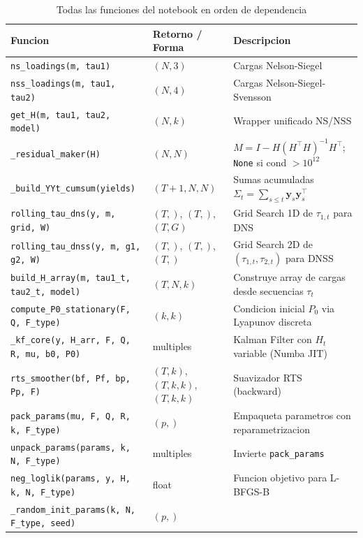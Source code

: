 \documentclass[12pt, a4paper]{article}
\theoremstyle{plain}
\theoremstyle{definition}
\theoremstyle{remark}
\newcommand{\by}{\mathbf{y}}
\begin{document}
\begin{table}[H]
\centering
\caption{Todas las funciones del notebook en orden de dependencia}
\label{tab:funciones}
\small
{}
\begin{tabular}{L{5.0cm} L{2.8cm} L{6.2cm}}
\toprule
{}
\color{white}\textbf{Funcion}
  & \color{white}\textbf{Retorno / Forma}
  & \color{white}\textbf{Descripcion} \\
\midrule
\texttt{ns\_loadings(m, tau1)}
  & $(N,3)$
  & Cargas Nelson-Siegel \\
\texttt{nss\_loadings(m, tau1, tau2)}
  & $(N,4)$
  & Cargas Nelson-Siegel-Svensson \\
\texttt{get\_H(m, tau1, tau2, model)}
  & $(N,k)$
  & Wrapper unificado NS/NSS \\
\texttt{\_residual\_maker(H)}
  & $(N,N)$
  & $M = I - H(H^\top H)^{-1}H^\top$; \texttt{None} si cond $> 10^{12}$ \\
\texttt{\_build\_YYt\_cumsum(yields)}
  & $(T+1,N,N)$
  & Sumas acumuladas $\Sigma_t = \sum_{s\leq t}\by_s\by_s^\top$ \\
\texttt{rolling\_tau\_dns(y, m, grid, W)}
  & $(T,)$, $(T,)$, $(T,G)$
  & Grid Search 1D de $\tau_{1,t}$ para DNS \\
\texttt{rolling\_tau\_dnss(y, m, g1, g2, W)}
  & $(T,)$, $(T,)$, $(T,)$
  & Grid Search 2D de $(\tau_{1,t},\tau_{2,t})$ para DNSS \\
\texttt{build\_H\_array(m, tau1\_t, tau2\_t, model)}
  & $(T,N,k)$
  & Construye array de cargas desde secuencias $\tau_t$ \\
\texttt{compute\_P0\_stationary(F, Q, F\_type)}
  & $(k,k)$
  & Condicion inicial $P_0$ via Lyapunov discreta \\
\texttt{\_kf\_core(y, H\_arr, F, Q, R, mu, b0, P0)}
  & multiples
  & Kalman Filter con $H_t$ variable (Numba JIT) \\
\texttt{rts\_smoother(bf, Pf, bp, Pp, F)}
  & $(T,k)$, $(T,k,k)$, $(T,k,k)$
  & Suavizador RTS (backward) \\
\texttt{pack\_params(mu, F, Q, R, k, F\_type)}
  & $(p,)$
  & Empaqueta parametros con reparametrizacion \\
\texttt{unpack\_params(params, k, N, F\_type)}
  & multiples
  & Invierte \texttt{pack\_params} \\
\texttt{neg\_loglik(params, y, H, k, N, F\_type)}
  & float
  & Funcion objetivo para L-BFGS-B \\
\texttt{\_random\_init\_params(k, N, F\_type, seed)}
  & $(p,)$

\end{tabular}
\end{table}
\end{document}
